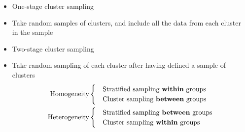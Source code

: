 \documentclass[../notes_compiled.tex]{subfiles}
\begin{document}
\begin{itemize}
\begin{itemize}
\item One-stage cluster sampling
\item[] Take random samples of clusters, and include all the data from each cluster in the sample
\item Two-stage cluster sampling
\item[] Take random sampling of each cluster after having defined a sample of clusters
\begin{align*}
\text{Homogeneity} & \begin{cases}&\text{Stratified sampling \textbf{within} groups} \\ &\text{Cluster sampling \textbf{between} groups} \end{cases}\\
\text{Heterogeneity} & \begin{cases}&\text{Stratified sampling \textbf{between} groups} \\ &\text{Cluster sampling \textbf{within} groups} \end{cases}
\end{align*}
\end{itemize}
\end{itemize}
\end{document}
